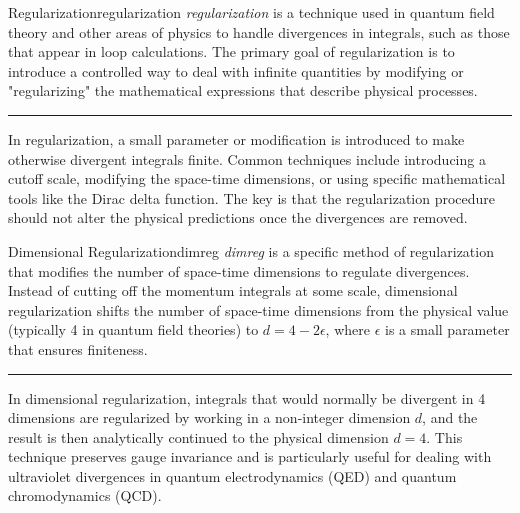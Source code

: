 \begin{definitionbox}{Regularization}{regularization}
    \emph{\gls{regularization}} is a technique used in quantum field theory and other areas of physics to handle divergences in integrals, such as those that appear in loop calculations. The primary goal of regularization is to introduce a controlled way to deal with infinite quantities by modifying or "regularizing" the mathematical expressions that describe physical processes.

    \vspace{7pt}
    \hrule
    \vspace{7pt}

    In regularization, a small parameter or modification is introduced to make otherwise divergent integrals finite. Common techniques include introducing a cutoff scale, modifying the space-time dimensions, or using specific mathematical tools like the Dirac delta function. The key is that the regularization procedure should not alter the physical predictions once the divergences are removed.

\end{definitionbox}


\begin{definitionbox}{Dimensional Regularization}{dimreg}
    \emph{\gls{dimreg}} is a specific method of regularization that modifies the number of space-time dimensions to regulate divergences. Instead of cutting off the momentum integrals at some scale, dimensional regularization shifts the number of space-time dimensions from the physical value (typically 4 in quantum field theories) to \( d = 4 - 2\epsilon \), where \( \epsilon \) is a small parameter that ensures finiteness.

    \vspace{7pt}
    \hrule
    \vspace{7pt}

    In dimensional regularization, integrals that would normally be divergent in 4 dimensions are regularized by working in a non-integer dimension \( d \), and the result is then analytically continued to the physical dimension \( d = 4 \). This technique preserves gauge invariance and is particularly useful for dealing with ultraviolet divergences in quantum electrodynamics (QED) and quantum chromodynamics (QCD).
\end{definitionbox}

